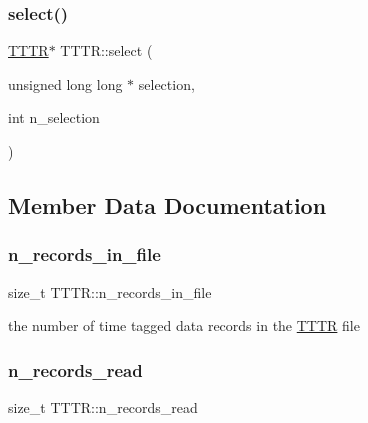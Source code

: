 \mbox{\label{class_t_t_t_r_aa9b6d4e201da050bf7ed1112c605ce72}} 
\subsubsection{\texorpdfstring{select()}{select()}}
{\footnotesize\ttfamily \hyperlink{class_t_t_t_r}{T\+T\+TR}$\ast$ T\+T\+T\+R\+::select (\begin{DoxyParamCaption}\item[{unsigned long long $\ast$}]{selection,  }\item[{int}]{n\+\_\+selection }\end{DoxyParamCaption})}



\subsection{Member Data Documentation}
\mbox{\label{class_t_t_t_r_a019c849293e3d3be29f5f6459bee6181}} 
\subsubsection{\texorpdfstring{n\+\_\+records\+\_\+in\+\_\+file}{n\_records\_in\_file}}
{\footnotesize\ttfamily size\+\_\+t T\+T\+T\+R\+::n\+\_\+records\+\_\+in\+\_\+file\hspace{0.3cm}{\ttfamily [protected]}}



the number of time tagged data records in the \hyperlink{class_t_t_t_r}{T\+T\+TR} file 

\mbox{\label{class_t_t_t_r_a4cc37548f6564c05496d95ca1b25b2d4}} 
\subsubsection{\texorpdfstring{n\+\_\+records\+\_\+read}{n\_records\_read}}
{\footnotesize\ttfamily size\+\_\+t T\+T\+T\+R\+::n\+\_\+records\+\_\+read\hspace{0.3cm}{\ttfamily [protected]}}




